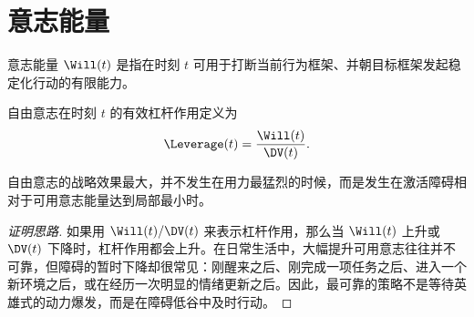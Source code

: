 \section{意志能量}

\begin{definition}[意志能量]
意志能量 $\Will(t)$ 是指在时刻 $t$ 可用于打断当前行为框架、并朝目标框架发起稳定化行动的有限能力。
\end{definition}

\begin{definition}[杠杆作用]
自由意志在时刻 $t$ 的有效杠杆作用定义为
\[
  \Leverage(t) = \frac{\Will(t)}{\DV(t)}.
\]
\end{definition}

\begin{theorem}[决策窗口原理]
自由意志的战略效果最大，并不发生在用力最猛烈的时候，而是发生在激活障碍相对于可用意志能量达到局部最小时。
\end{theorem}

\begin{proof}[证明思路]
如果用 $\Will(t)/\DV(t)$ 来表示杠杆作用，那么当 $\Will(t)$ 上升或 $\DV(t)$ 下降时，杠杆作用都会上升。在日常生活中，大幅提升可用意志往往并不可靠，但障碍的暂时下降却很常见：刚醒来之后、刚完成一项任务之后、进入一个新环境之后，或在经历一次明显的情绪更新之后。因此，最可靠的策略不是等待英雄式的动力爆发，而是在障碍低谷中及时行动。
\end{proof}
